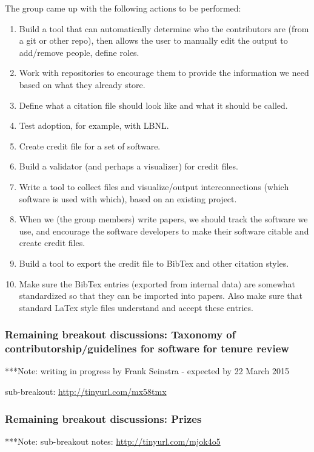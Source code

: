 \documentclass[11pt, oneside]{amsart}
\newcommand{\note}[1]{ {\textcolor{blueish}    { ***Note:      #1 }}}
\begin{document}
The group came up with the following actions to be performed:
\begin{enumerate}
\item Build a tool that can automatically determine who the contributors are (from a git or other repo), then allows the user to manually edit the output to add/remove people, define roles. 
\item Work with repositories to encourage them to provide the information we need based on what they already store.
\item Define what a citation file should look like and what it should be called.
\item Test adoption, for example, with LBNL.
\item Create credit file for a set of software.
\item Build a validator (and perhaps a visualizer) for credit files.
\item Write a tool to collect files and visualize/output interconnections (which software is used with which), based on an existing project.
\item When we (the group members) write papers, we should track the software we use, and encourage the software developers to make their software citable and create credit files.
\item Build a tool to export the credit file to BibTex and other citation styles.
\item Make sure the BibTex entries (exported from internal data) are somewhat standardized so that they can be imported into papers.  Also make sure that standard LaTex style files understand and accept these entries.
\end{enumerate}




\subsubsection{Remaining breakout discussions: Taxonomy of contributorship/guidelines for software for tenure review}
\note{writing in progress by Frank Seinstra - expected by 22 March 2015}

sub-breakout: \url{http://tinyurl.com/mx58tmx}


\subsubsection{Remaining breakout discussions: Prizes}\label{sec:prizes}
\note{sub-breakout notes: \url{http://tinyurl.com/mjok4o5}}
\end{document}
